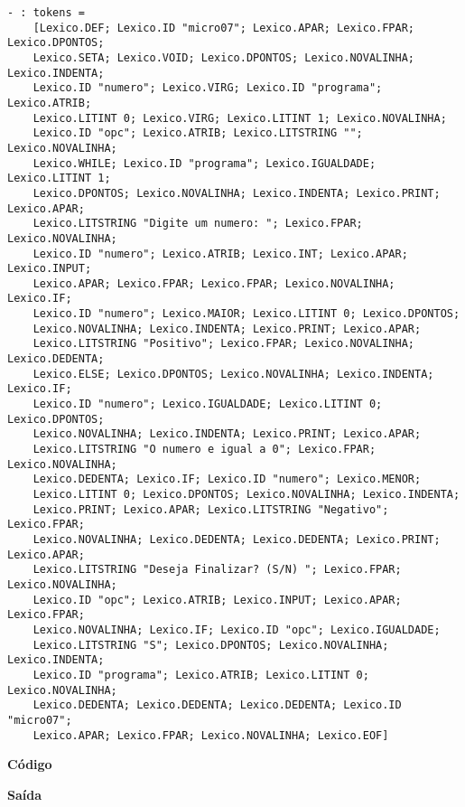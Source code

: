 \documentclass[hidelinks,12pt]{article}
\begin{document}
	\begin{lstlisting}[caption=Analisador Léxico]
	- : tokens =
	[Lexico.DEF; Lexico.ID "micro07"; Lexico.APAR; Lexico.FPAR; Lexico.DPONTOS;
	Lexico.SETA; Lexico.VOID; Lexico.DPONTOS; Lexico.NOVALINHA; Lexico.INDENTA;
	Lexico.ID "numero"; Lexico.VIRG; Lexico.ID "programa"; Lexico.ATRIB;
	Lexico.LITINT 0; Lexico.VIRG; Lexico.LITINT 1; Lexico.NOVALINHA;
	Lexico.ID "opc"; Lexico.ATRIB; Lexico.LITSTRING ""; Lexico.NOVALINHA;
	Lexico.WHILE; Lexico.ID "programa"; Lexico.IGUALDADE; Lexico.LITINT 1;
	Lexico.DPONTOS; Lexico.NOVALINHA; Lexico.INDENTA; Lexico.PRINT; Lexico.APAR;
	Lexico.LITSTRING "Digite um numero: "; Lexico.FPAR; Lexico.NOVALINHA;
	Lexico.ID "numero"; Lexico.ATRIB; Lexico.INT; Lexico.APAR; Lexico.INPUT;
	Lexico.APAR; Lexico.FPAR; Lexico.FPAR; Lexico.NOVALINHA; Lexico.IF;
	Lexico.ID "numero"; Lexico.MAIOR; Lexico.LITINT 0; Lexico.DPONTOS;
	Lexico.NOVALINHA; Lexico.INDENTA; Lexico.PRINT; Lexico.APAR;
	Lexico.LITSTRING "Positivo"; Lexico.FPAR; Lexico.NOVALINHA; Lexico.DEDENTA;
	Lexico.ELSE; Lexico.DPONTOS; Lexico.NOVALINHA; Lexico.INDENTA; Lexico.IF;
	Lexico.ID "numero"; Lexico.IGUALDADE; Lexico.LITINT 0; Lexico.DPONTOS;
	Lexico.NOVALINHA; Lexico.INDENTA; Lexico.PRINT; Lexico.APAR;
	Lexico.LITSTRING "O numero e igual a 0"; Lexico.FPAR; Lexico.NOVALINHA;
	Lexico.DEDENTA; Lexico.IF; Lexico.ID "numero"; Lexico.MENOR;
	Lexico.LITINT 0; Lexico.DPONTOS; Lexico.NOVALINHA; Lexico.INDENTA;
	Lexico.PRINT; Lexico.APAR; Lexico.LITSTRING "Negativo"; Lexico.FPAR;
	Lexico.NOVALINHA; Lexico.DEDENTA; Lexico.DEDENTA; Lexico.PRINT; Lexico.APAR;
	Lexico.LITSTRING "Deseja Finalizar? (S/N) "; Lexico.FPAR; Lexico.NOVALINHA;
	Lexico.ID "opc"; Lexico.ATRIB; Lexico.INPUT; Lexico.APAR; Lexico.FPAR;
	Lexico.NOVALINHA; Lexico.IF; Lexico.ID "opc"; Lexico.IGUALDADE;
	Lexico.LITSTRING "S"; Lexico.DPONTOS; Lexico.NOVALINHA; Lexico.INDENTA;
	Lexico.ID "programa"; Lexico.ATRIB; Lexico.LITINT 0; Lexico.NOVALINHA;
	Lexico.DEDENTA; Lexico.DEDENTA; Lexico.DEDENTA; Lexico.ID "micro07";
	Lexico.APAR; Lexico.FPAR; Lexico.NOVALINHA; Lexico.EOF]
	\end{lstlisting}
	
	
	{\large \textbf{Código} }
			
	
	{\large \textbf{Saída}}
	
\end{document}

